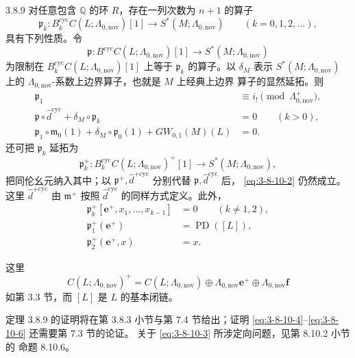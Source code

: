\begin{theorem}{3.8.9}\label{thm:3-8-9}
对任意包含 $\mathbb Q$ 的环 $R$，存在一列次数为 $n+1$ 的算子
\[
 \mathfrak p_k\colon
 B_k^{\mathrm{cyc}}C(L;\Lambda_{0,\mathrm{nov}})[1]
 \longrightarrow
 S^*(M;\Lambda_{0,\mathrm{nov}})
 \qquad(k=0,1,2,\ldots),
\]
具有下列性质。令
\[
 \mathfrak p\colon
 B^{\mathrm{cyc}}C(L;\Lambda_{0,\mathrm{nov}})[1]
 \longrightarrow
 S^*(M;\Lambda_{0,\mathrm{nov}})
\]
为限制在
$B_k^{\mathrm{cyc}}C(L;\Lambda_{0,\mathrm{nov}})[1]$ 上等于
$\mathfrak p_k$ 的算子。以 $\delta_M$ 表示
$S^*(M;\Lambda_{0,\mathrm{nov}})$ 上的
$\Lambda_{0,\mathrm{nov}}$-系数上边界算子，也就是 $M$ 上经典上边界
算子的显然延拓。则
\begin{align}
 \mathfrak p_1
 &\equiv i_!\pmod{\Lambda^+_{0,\mathrm{nov}}},
 \tag{3.8.10.1}\label{eq:3-8-10-1}\\
 \mathfrak p\circ\widehat d^{\mathrm{cyc}}
 +\delta_M\circ\mathfrak p_k
 &=0
 \qquad(k>0),
 \tag{3.8.10.2}\label{eq:3-8-10-2}\\
 \mathfrak p_1\circ\mathfrak m_0(1)
 +\delta_M\circ\mathfrak p_0(1)
 +GW_{0,1}(M)(L)
 &=0.
 \tag{3.8.10.3}\label{eq:3-8-10-3}
\end{align}
还可把 $\mathfrak p_k$ 延拓为
\[
 \mathfrak p_k^+\colon
 B_k^{\mathrm{cyc}}C(L;\Lambda_{0,\mathrm{nov}})^+[1]
 \longrightarrow
 S^*(M;\Lambda_{0,\mathrm{nov}}),
\]
把同伦幺元纳入其中；以
$\mathfrak p^+,\widehat d^{+\mathrm{cyc}}$ 分别代替
$\mathfrak p,\widehat d^{\mathrm{cyc}}$ 后，
\eqref{eq:3-8-10-2} 仍然成立。这里
$\widehat d^{+\mathrm{cyc}}$ 由 $\mathfrak m^+$ 按照
$\widehat d^{\mathrm{cyc}}$ 的同样方式定义。此外，
\begin{align}
 \mathfrak p_k^+
 [\mathbf e^+,x_1,\ldots,x_{k-1}]
 &=0
 \qquad(k\ne1,2),
 \tag{3.8.10.4}\label{eq:3-8-10-4}\\
 \mathfrak p_1^+(\mathbf e^+)
 &=\operatorname{PD}([L]),
 \tag{3.8.10.5}\label{eq:3-8-10-5}\\
 \mathfrak p_2^+(\mathbf e^+,x)
 &=x.
 \tag{3.8.10.6}\label{eq:3-8-10-6}
\end{align}
\end{theorem}

这里
\[
 C(L;\Lambda_{0,\mathrm{nov}})^+
 =
 C(L;\Lambda_{0,\mathrm{nov}})
 \oplus\Lambda_{0,\mathrm{nov}}\mathbf e^+
 \oplus\Lambda_{0,\mathrm{nov}}\mathbf f
\]
如第 3.3 节，而 $[L]$ 是 $L$ 的基本闭链。

定理 3.8.9 的证明将在第 3.8.3 小节与第 7.4 节给出；证明
\eqref{eq:3-8-10-4}--\eqref{eq:3-8-10-6} 还需要第 7.3 节的论证。
关于 \eqref{eq:3-8-10-3} 所涉定向问题，见第 8.10.2 小节的
命题 8.10.6。

